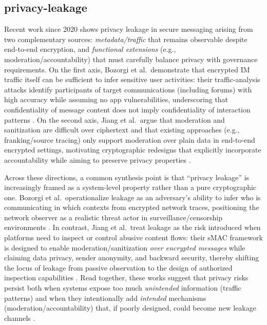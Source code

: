 \subsection{privacy-leakage}
Recent work since 2020 shows privacy leakage in secure messaging arising from two complementary sources: \emph{metadata/traffic} that remains observable despite end-to-end encryption, and \emph{functional extensions} (e.g., moderation/accountability) that must carefully balance privacy with governance requirements. On the first axis, Bozorgi et al.\ demonstrate that encrypted IM traffic itself can be sufficient to infer sensitive user activities: their traffic-analysis attacks identify participants of target communications (including forums) with high accuracy while assuming no app vulnerabilities, underscoring that confidentiality of message content does not imply confidentiality of interaction patterns \cite{bozorgi2023}. On the second axis, Jiang et al.\ argue that moderation and sanitization are difficult over ciphertext and that existing approaches (e.g., franking/source tracing) only support moderation over plain data in end-to-end encrypted settings, motivating cryptographic redesigns that explicitly incorporate accountability while aiming to preserve privacy properties \cite{jiang2024}.

Across these directions, a common synthesis point is that “privacy leakage” is increasingly framed as a system-level property rather than a pure cryptographic one. Bozorgi et al.\ operationalize leakage as an adversary’s ability to infer who is communicating in which contexts from encrypted network traces, positioning the network observer as a realistic threat actor in surveillance/censorship environments \cite{bozorgi2023}. In contrast, Jiang et al.\ treat leakage as the risk introduced when platforms need to inspect or control abusive content flows: their sMAC framework is designed to enable moderation/sanitization \emph{over encrypted messages} while claiming data privacy, sender anonymity, and backward security, thereby shifting the locus of leakage from passive observation to the design of authorized inspection capabilities \cite{jiang2024}. Read together, these works suggest that privacy risks persist both when systems expose too much \emph{unintended} information (traffic patterns) and when they intentionally add \emph{intended} mechanisms (moderation/accountability) that, if poorly designed, could become new leakage channels \cite{bozorgi2023,jiang2024}.

